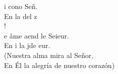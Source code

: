 \begin{cancion}%
	i cono Señ.  \\
	En  la del z\\
	!   \\
\jump
	e âme aend le Seieur.\\
	En i la jde eur.\\
(Nuestra alma mira al Señor,\\
En Él la alegría de nuestro corazón)\\
\end{cancion}%
